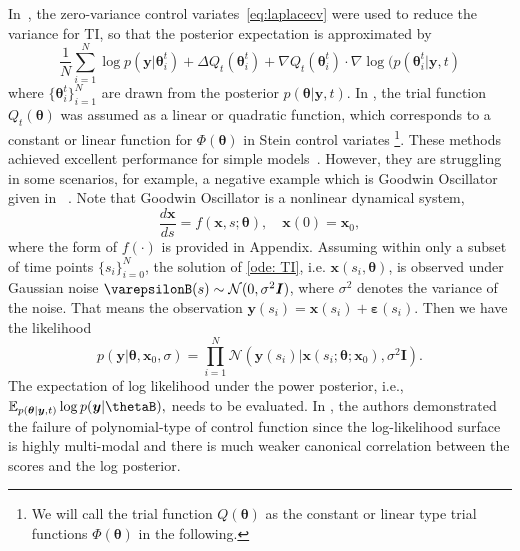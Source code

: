 \documentclass[runningheads]{llncs}
\begin{document}
In~\cite{oates2016controlled}, the zero-variance control variates~\eqref{eq:laplacecv} were used to reduce the variance for TI, so that the posterior expectation is approximated by
\begin{equation}
\frac{1}{N}\sum_{i = 1}^N \log p(\bm{y} |\bm{\theta}_i^t) + \Delta Q_t(\bm{\theta}_i^t) + \nabla Q_t(\bm{\theta}_i^t) \cdot \nabla \log (p(\bm{\theta}_i^t |\bm{y}, t)
\end{equation}
where $\{\bm{\theta}_i^t \}_{i=1}^N$ are drawn from the posterior $p(\bm{\theta}|\bm{y}, t)$.  In \cite{oates2016controlled}, the trial function $Q_t(\bm{\theta})$ was assumed as a linear or quadratic function, which corresponds to a constant or linear function for $\Phi(\bm{\theta})$ in Stein control variates \footnote{We will call the trial function $Q(\bm{\theta})$ as the constant or linear type trial functions $\Phi(\bm{\theta})$ in the following.}. These methods achieved excellent performance for simple models~\cite{oates2016controlled}.  
However, they are struggling in some scenarios, for example, a negative example which is Goodwin Oscillator given in ~\cite{oates2016controlled}. Note that Goodwin Oscillator is a nonlinear dynamical system,
\begin{equation}
\frac{d \bm{x}}{ds} = f(\bm{x}, s; \bm{\theta}), \quad \bm{x}(0) = \bm{x}_{0}, \label{ode: TI}
\end{equation}
where the form of $f(\cdot)$ is provided in Appendix. 
Assuming within only a subset of time points $\{s_i \}_{i=0}^{N}$,  the solution of \eqref{ode: TI}, i.e. $\bm{x}(s_i, \bm{\theta})$, is observed under Gaussian noise $\varepsilonB(s) \sim \mathcal{N}(0, \sigma^2 \bm{I})$, where $\sigma^2$ denotes the variance of the noise. That means the observation $\bm{y}(s_i) = \bm{x}(s_i) + \bm{\varepsilon}(s_i)$.  Then we have the likelihood 
\begin{equation}
    p(\bm{y}|\bm{\theta}, \bm{x}_0, \sigma)  = \prod_{i=1}^N\mathcal{N}(\bm{y}(s_i)|\bm{x}(s_i; \bm{\theta}; \bm{x}_0), \sigma^2 \bm{I}).
\end{equation}
%
The expectation of log likelihood under the power posterior, i.e.,
$
\mathbb{E}_{p
(\bm{\theta}|\bm{y}, t)}\log p(\bm{y} | \thetaB),
$ 
needs to be evaluated. In \cite{oates2016controlled}, the authors demonstrated the failure of polynomial-type of control function since the log-likelihood surface is highly multi-modal and there is much weaker canonical correlation between the scores and the log posterior. 
\end{document}
